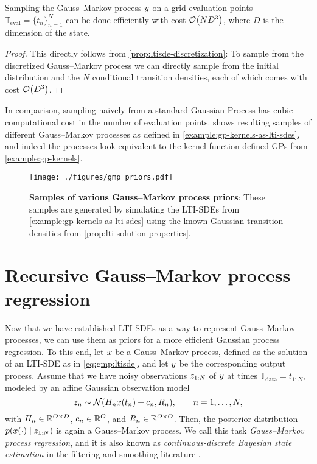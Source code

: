 \documentclass{mimosis}
\begin{document}
\begin{corollary}
\label{cor:lti-sde-sampling}
Sampling the Gauss--Markov process \(y\) on a grid evaluation points
\(\mathbb{T}_\text{eval} = \{t_n\}_{n=1}^N\)
can be done efficiently
with cost \(\order{N D^3}\), where \(D\) is the dimension of the state.
\end{corollary}

\begin{proof}
This directly follows from
\cref{prop:ltisde-discretization}: To sample from the discretized Gauss--Markov process we can directly sample from the initial distribution and the \(N\) conditional transition densities, each of which comes with cost \(\order{D^3}\).
\end{proof}

In comparison, sampling naively from a standard Gaussian Process has cubic computational cost in the number of evaluation points.
 shows resulting samples of different Gauss--Markov processes as defined in \cref{example:gp-kernels-as-lti-sdes},
and indeed the processes look equivalent to the kernel function-defined GPs from \cref{example:gp-kernels}.

\begin{figure}[t]
\centering
\texttt{[image: ./figures/gmp\_priors.pdf]}
\caption{\label{fig:gmp_priors}\textbf{Samples of various Gauss--Markov process priors}: These samples are generated by simulating the LTI-SDEs from \cref{example:gp-kernels-as-lti-sdes} using the known Gaussian transition densities from \cref{prop:lti-solution-properties}.}
\end{figure}
\section{Recursive Gauss--Markov process regression}
\label{sec:org187df48}
\label{sec:gauss-markov-process-regression}
Now that we have established LTI-SDEs as a way to represent Gauss--Markov processes, we can use them as priors for a more efficient Gaussian process regression.
To this end, let \(x\) be a Gauss--Markov process, defined as the solution of an LTI-SDE as in \cref{eq:gmp:ltisde}, and let \(y\) be the corresponding output process.
Assume that we have noisy observations \(z_{1:N}\) of \(y\) at times \(\mathbb{T}_\text{data} = t_{1:N}\), modeled by an affine Gaussian observation model
\begin{equation}
  \label{eq:gpm:obsmod}
  \sobs_\idxt \sim \N( \obsA_\idxt \st(t_\idxt) + \obsb_\idxt, \obsC_\idxt ), \qquad \idxt = 1, \dots, N,
\end{equation}
with
\(H_n \in \mathbb{R}^{O \times D}\),
\(c_n \in \mathbb{R}^O\),
and
\(R_n \in \mathbb{R}^{O \times O}\).
Then, the posterior distribution
\(\p(\st(\cdot) \mid \sobs_{1:N})\)
is again a Gauss--Markov process.
We call this task \emph{Gauss--Markov process regression},
and it is also known as
\emph{continuous-discrete Bayesian state estimation}
in the filtering and smoothing literature
\parencite[Section 10.5]{sarkka_solin_2019}.
\end{document}
